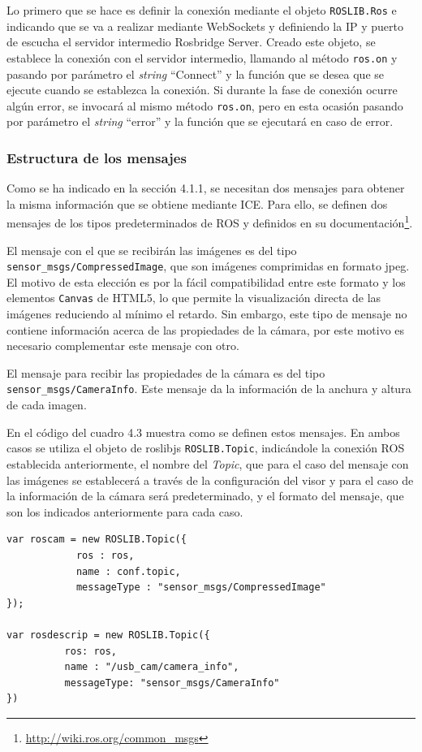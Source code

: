 Lo primero que se hace es definir la conexión mediante el objeto \texttt{ROSLIB.Ros} e indicando que se va a realizar mediante WebSockets y definiendo la IP y puerto de escucha el servidor intermedio Rosbridge Server. Creado este objeto, se establece la conexión con el servidor intermedio, llamando al método \texttt{ros.on} y pasando por parámetro el \textit{string} ``Connect'' y la función que se desea que se ejecute cuando se establezca la conexión. Si durante la fase de conexión ocurre algún error, se invocará al mismo método \texttt{ros.on}, pero en esta ocasión pasando por parámetro el \textit{string} ``error'' y la función que se ejecutará en caso de error.

\subsubsection{Estructura de los mensajes}
Como se ha indicado en la sección 4.1.1, se necesitan dos mensajes para obtener la misma información que se obtiene mediante ICE. Para ello, se definen dos mensajes de los tipos predeterminados de ROS y definidos en su documentación\footnote{\url{http://wiki.ros.org/common_msgs}}.

El mensaje con el que se recibirán las imágenes es del tipo \texttt{sensor\_msgs/CompressedImage}, que son imágenes comprimidas en formato jpeg. El motivo de esta elección es por la fácil compatibilidad entre este formato y los elementos \texttt{Canvas} de HTML5, lo que permite la visualización directa de las imágenes reduciendo al mínimo el retardo. Sin embargo, este tipo de mensaje no contiene información acerca de las propiedades de la cámara, por este motivo es necesario complementar este mensaje con otro.

El mensaje para recibir las propiedades de la cámara es del tipo \texttt{sensor\_msgs/CameraInfo}. Este mensaje da la información de la anchura y altura de cada imagen.

En el código del cuadro 4.3 muestra como se definen estos mensajes. En ambos casos se utiliza el objeto de roslibjs \texttt{ROSLIB.Topic}, indicándole la conexión ROS establecida anteriormente, el nombre del \textit{Topic}, que para el caso del mensaje con las imágenes se establecerá a través de la configuración del visor y para el caso de la información de la cámara será predeterminado, y el formato del mensaje, que son los indicados anteriormente para cada caso.

\begin{lstlisting}[caption= Definición de los mensajes ROS, label=cod.mensajescamviz]
var roscam = new ROSLIB.Topic({
            ros : ros,
            name : conf.topic,
            messageType : "sensor_msgs/CompressedImage"
});

var rosdescrip = new ROSLIB.Topic({
          ros: ros,
          name : "/usb_cam/camera_info",
          messageType: "sensor_msgs/CameraInfo"
})
\end{lstlisting}


